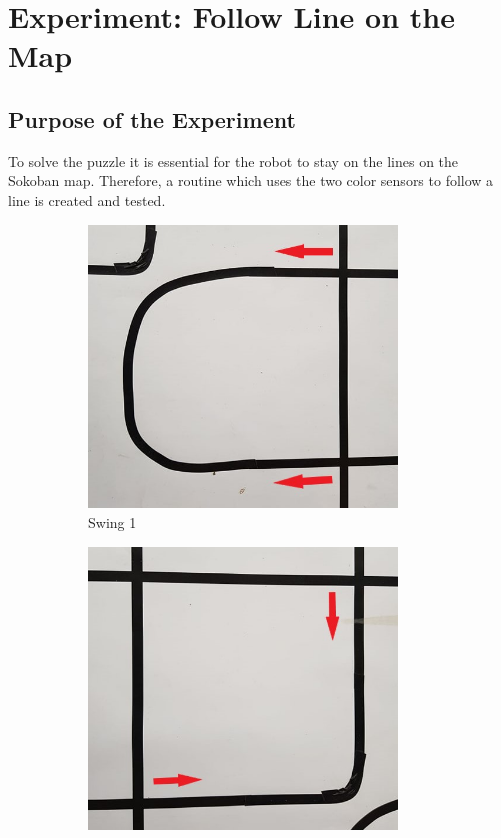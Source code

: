 \documentclass[../report.tex]{subfiles}
\begin{document}
\section{Experiment: Follow Line on the Map} \label{app:line_follower}

\subsection*{Purpose of the Experiment}
To solve the puzzle it is essential for the robot to stay on the lines on the Sokoban map. Therefore, a routine which uses the two color sensors to follow a line is created and tested.
\begin{figure}[H]
    \centering
    \begin{subfigure}{0.5\textwidth}
        \centering
        \includegraphics[width=0.9\textwidth]{figures/experiment_line_follower/line_follower_swing1.jpg}
        \caption{Swing 1}
        \label{fig:line_follower_swing1}
    \end{subfigure}%
    \begin{subfigure}{0.5\textwidth}
        \centering
        \includegraphics[width=0.9\textwidth]{figures/experiment_line_follower/line_follower_swing2.jpg}

\end{subfigure}
\end{figure}
\end{document}
